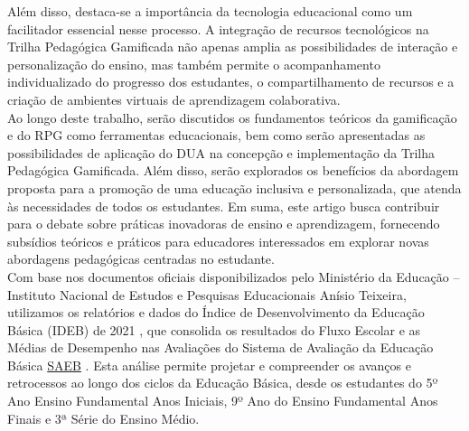 Além disso, destaca-se a importância da tecnologia educacional como um facilitador essencial nesse processo. A integração de recursos tecnológicos na Trilha Pedagógica Gamificada não apenas amplia as possibilidades de interação e personalização do ensino, mas também permite o acompanhamento individualizado do progresso dos estudantes, o compartilhamento de recursos e a criação de ambientes virtuais de aprendizagem colaborativa.
\\

Ao longo deste trabalho, serão discutidos os fundamentos teóricos da gamificação e do RPG como ferramentas educacionais, bem como serão apresentadas as possibilidades de aplicação do DUA na concepção e implementação da Trilha Pedagógica Gamificada. Além disso, serão explorados os benefícios da abordagem proposta para a promoção de uma educação inclusiva e personalizada, que atenda às necessidades de todos os estudantes. Em suma, este artigo busca contribuir para o debate sobre práticas inovadoras de ensino e aprendizagem, fornecendo subsídios teóricos e práticos para educadores interessados em explorar novas abordagens pedagógicas centradas no estudante.
\\

Com base nos documentos oficiais disponibilizados pelo Ministério da Educação – Instituto Nacional de Estudos e Pesquisas Educacionais Anísio Teixeira, utilizamos os relatórios e dados do Índice de Desenvolvimento da Educação Básica (IDEB) de 2021 , que consolida os resultados do Fluxo Escolar e as Médias de Desempenho nas Avaliações do Sistema de Avaliação da Educação Básica \href{https://download.inep.gov.br/educacao_basica/saeb/2021/resultados/relatorio_de_resultados_do_saeb_2021_volume_1.pdf}{SAEB} \citep{Brasil2022}. Esta análise permite projetar e compreender os avanços e retrocessos ao longo dos ciclos da Educação Básica, desde os estudantes do 5º Ano Ensino Fundamental Anos Iniciais, 9º Ano do Ensino Fundamental Anos Finais e 3ª Série do Ensino Médio.
\\

